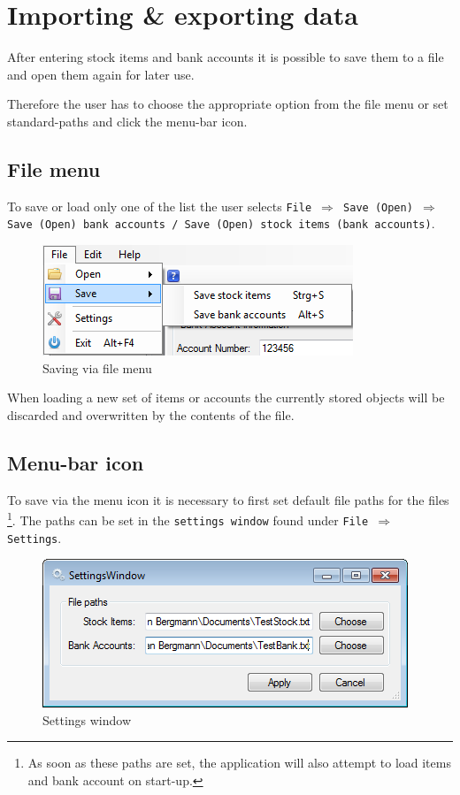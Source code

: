 \section{Importing \& exporting data}
\label{sec:import_export}

After entering stock items and bank accounts it is possible to save them to a file and open them again for later use.

Therefore the user has to choose the appropriate option from the file menu or set standard-paths and click the menu-bar icon.

\subsection{File menu}
\label{subsec:file_menu}

To save or load only one of the list the user selects \texttt{File $\Rightarrow$ Save (Open) $\Rightarrow$ Save (Open) bank accounts / Save (Open) stock items (bank accounts)}.

\begin{figure}[H]
\begin{center}
\includegraphics[scale=0.8]{gfx/save_file_menu.png}
\caption{Saving via file menu}
\label{fig:save_file_menu}
\end{center}
\end{figure}

When loading a new set of items or accounts the currently stored objects will be discarded and overwritten by the contents of the file.

\subsection{Menu-bar icon}

To save via the menu icon it is necessary to first set default file paths for the files \footnote{As soon as these paths are set, the application will also attempt to load items and bank account on start-up.}. The paths can be set in the \texttt{settings window} found under \texttt{File $\Rightarrow$ Settings}.

\begin{figure}[H]
\begin{center}
\includegraphics[scale=0.8]{gfx/settings_window.png}
\caption{Settings window}
\label{fig:settings_window}
\end{center}
\end{figure}

